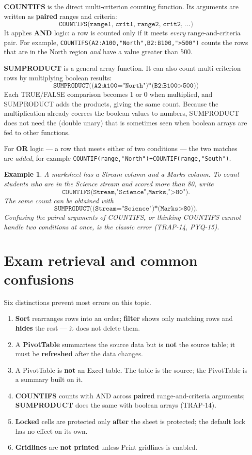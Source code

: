 \documentclass[11pt]{article}
\newtheorem{example}{Example}[section]
\begin{document}
\textbf{COUNTIFS} is the direct multi-criterion counting function. Its arguments
are written as \textbf{paired} ranges and criteria:
\[
\texttt{COUNTIFS(range1, crit1, range2, crit2, \ldots)}
\]
It applies \textbf{AND} logic: a row is counted only if it meets \emph{every}
range-and-criteria pair. For example,
\texttt{COUNTIFS(A2:A100,"North",B2:B100,">500")} counts the rows that are in
the North region \emph{and} have a value greater than 500.

\textbf{SUMPRODUCT} is a general array function. It can also count
multi-criterion rows by multiplying boolean results:
\[
\texttt{SUMPRODUCT((A2:A100="North")*(B2:B100>500))}
\]
Each TRUE/FALSE comparison becomes 1 or 0 when multiplied, and SUMPRODUCT adds
the products, giving the same count. Because the multiplication already coerces
the boolean values to numbers, SUMPRODUCT does not need the \key{--} (double
unary) that is sometimes seen when boolean arrays are fed to other functions.

For \textbf{OR} logic --- a row that meets either of two conditions --- the two
matches are \emph{added}, for example
\texttt{COUNTIF(range,"North")+COUNTIF(range,"South")}.

\begin{example}
A marksheet has a Stream column and a Marks column. To count students who are in
the Science stream \emph{and} scored more than 80, write
\[ \texttt{COUNTIFS(Stream,"Science",Marks,">80")}. \]
The same count can be obtained with
\[ \texttt{SUMPRODUCT((Stream="Science")*(Marks>80))}. \]
Confusing the paired arguments of COUNTIFS, or thinking COUNTIFS cannot handle
two conditions at once, is the classic error (TRAP-14, PYQ-15).
\end{example}

\section{Exam retrieval and common confusions}
Six distinctions prevent most errors on this topic.
\begin{enumerate}
  \item \textbf{Sort} rearranges rows into an order; \textbf{filter} shows only
    matching rows and \textbf{hides} the rest --- it does not delete them.
  \item A \textbf{PivotTable} summarises the source data but is \textbf{not} the
    source table; it must be \textbf{refreshed} after the data changes.
  \item A PivotTable is \textbf{not} an Excel table. The table is the source;
    the PivotTable is a summary built on it.
  \item \textbf{COUNTIFS} counts with AND across \textbf{paired}
    range-and-criteria arguments; \textbf{SUMPRODUCT} does the same with
    boolean arrays (TRAP-14).
  \item \textbf{Locked} cells are protected only \textbf{after} the sheet is
    protected; the default lock has no effect on its own.
  \item \textbf{Gridlines} are \textbf{not printed} unless Print gridlines is
    enabled.
\end{enumerate}
\end{document}
